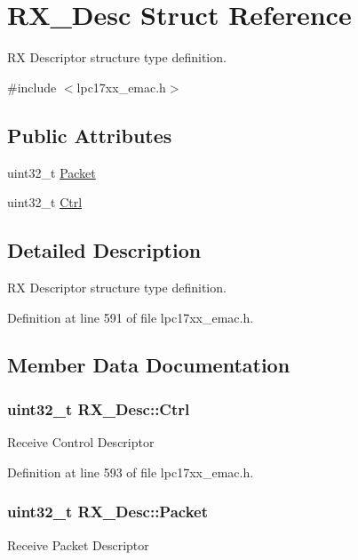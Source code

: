 \hypertarget{struct_r_x___desc}{\section{\-R\-X\-\_\-\-Desc \-Struct \-Reference}
\label{struct_r_x___desc}
}


\-R\-X \-Descriptor structure type definition.  




{\ttfamily \#include $<$lpc17xx\-\_\-emac.\-h$>$}

\subsection*{\-Public \-Attributes}
\begin{DoxyCompactItemize}
\item 
uint32\-\_\-t \hyperlink{struct_r_x___desc_a167c25f5ad46b63f3a3bd8b612be2c39}{\-Packet}
\item 
uint32\-\_\-t \hyperlink{struct_r_x___desc_abe31a11b0d2f046ba1bc6d6c394f1361}{\-Ctrl}
\end{DoxyCompactItemize}


\subsection{\-Detailed \-Description}
\-R\-X \-Descriptor structure type definition. 

\-Definition at line 591 of file lpc17xx\-\_\-emac.\-h.



\subsection{\-Member \-Data \-Documentation}
\hypertarget{struct_r_x___desc_abe31a11b0d2f046ba1bc6d6c394f1361}{
\subsubsection[{\-Ctrl}]{\setlength{\rightskip}{0pt plus 5cm}uint32\-\_\-t {\bf \-R\-X\-\_\-\-Desc\-::\-Ctrl}}}\label{struct_r_x___desc_abe31a11b0d2f046ba1bc6d6c394f1361}
\-Receive \-Control \-Descriptor 

\-Definition at line 593 of file lpc17xx\-\_\-emac.\-h.

\hypertarget{struct_r_x___desc_a167c25f5ad46b63f3a3bd8b612be2c39}{
\subsubsection[{\-Packet}]{\setlength{\rightskip}{0pt plus 5cm}uint32\-\_\-t {\bf \-R\-X\-\_\-\-Desc\-::\-Packet}}}\label{struct_r_x___desc_a167c25f5ad46b63f3a3bd8b612be2c39}
\-Receive \-Packet \-Descriptor 

